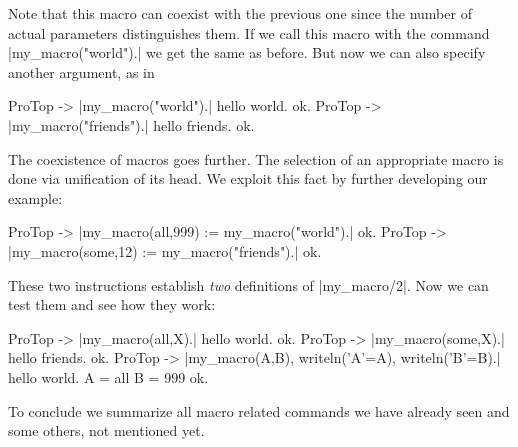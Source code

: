 Note that this macro can coexist with the previous one since the number of
actual parameters distinguishes them. If we call this macro with the command
|my_macro("world").| we get the same as before. But now we can also specify
another argument, as in
\begin{BoxedSample}
  ProTop -> |my_macro("world").|
  hello world.
  ok.
  ProTop -> |my_macro("friends").|
  hello friends.
  ok.
\end{BoxedSample}

The coexistence of macros goes further. The selection of an appropriate macro
is done via unification of its head. We exploit this fact by further
developing our example:
\begin{BoxedSample}
  ProTop -> |my_macro(all,999) := my_macro("world").|
  ok.
  ProTop -> |my_macro(some,12) := my_macro("friends").|
  ok.
\end{BoxedSample}

These two instructions establish {\em two} definitions of |my_macro/2|. Now we
can test them and see how they work:

\begin{BoxedSample}
  ProTop -> |my_macro(all,X).|
  hello world.
  ok.
  ProTop -> |my_macro(some,X).|
  hello friends.
  ok.
  ProTop -> |my_macro(A,B), writeln('A'=A), writeln('B'=B).|
  hello world.
  A = all
  B = 999
  ok.
\end{BoxedSample}

To conclude we summarize all macro related commands we have already seen and
some others, not mentioned yet.

